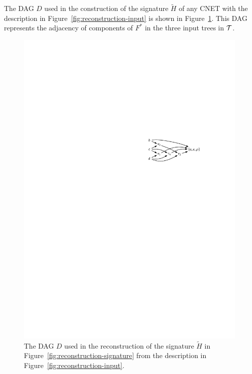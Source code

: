 The DAG $D$ used in the construction of the signature $\tilde H$ of any CNET
with the description in Figure~\ref{fig:reconstruction-input} is shown in
Figure~\ref{fig:signature-dag}.
This DAG represents the adjacency of components of $F^*$ in the three input
trees in $\mathcal{T}$.

\begin{figure}[h]
  \centering
  \includegraphics{../figs/ch4/signature-dag}
  \caption{The DAG $D$ used in the reconstruction of the signature $\tilde H$
    in Figure~\ref{fig:reconstruction-signature} from the description in
    Figure~\ref{fig:reconstruction-input}.}
  \label{fig:signature-dag}
\end{figure}

